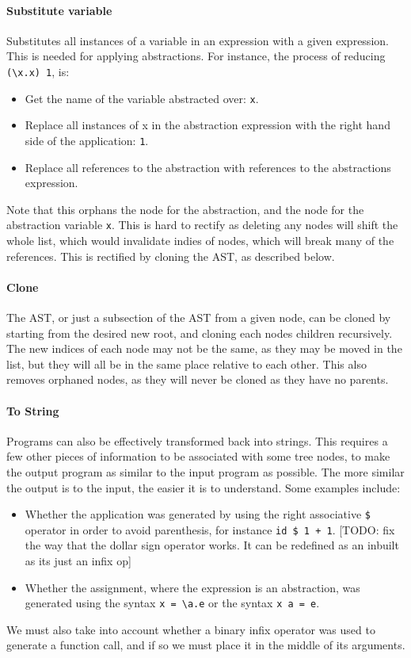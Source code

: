 \paragraph{Substitute variable} Substitutes all instances of a variable in an expression with a given expression. This is needed for applying abstractions. For instance, the process of reducing \verb|(\x.x) 1|, is:
\begin{itemize}
    \item Get the name of the variable abstracted over: \verb|x|.
    \item Replace all instances of x in the abstraction expression with the right hand side of the application: \verb|1|.
    \item Replace all references to the abstraction with references to the abstractions expression. 
\end{itemize}
Note that this orphans the node for the abstraction, and the node for the abstraction variable \verb|x|. This is hard to rectify as deleting any nodes will shift the whole list, which would invalidate indies of nodes, which will break many of the references. This is rectified by cloning the AST, as described below.

\paragraph{Clone} The AST, or just a subsection of the AST from a given node, can be cloned by starting from the desired new root, and cloning each nodes children recursively. The new indices of each node may not be the same, as they may be moved in the list, but they will all be in the same place relative to each other. This also removes orphaned nodes, as they will never be cloned as they have no parents. 

\paragraph{To String} \label{paragraph:to_string} Programs can also be effectively transformed back into strings. This requires a few other pieces of information to be associated with some tree nodes, to make the output program as similar to the input program as possible. The more similar the output is to the input, the easier it is to understand. Some examples include:
\begin{itemize}
    \item Whether the application was generated by using the right associative \verb|$| operator in order to avoid parenthesis, for instance \verb|id $ 1 + 1|. [TODO: fix the way that the dollar sign operator works. It can be redefined as an inbuilt as its just an infix op]
    \item Whether the assignment, where the expression is an abstraction, was generated using the syntax \verb|x = \a.e| or the syntax \verb|x a = e|. 
\end{itemize}
We must also take into account whether a binary infix operator was used to generate a function call, and if so we must place it in the middle of its arguments. 

